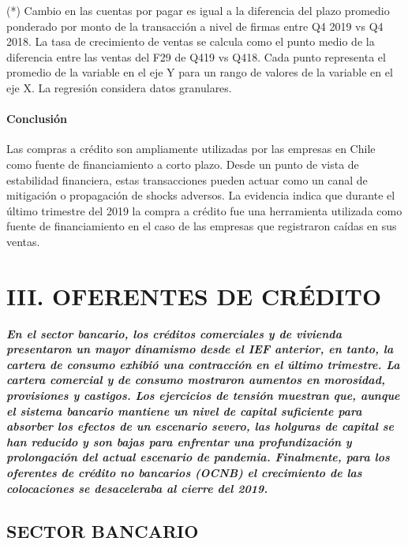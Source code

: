 \documentclass[
]{book}
\begin{document}
(*) Cambio en las cuentas por pagar es igual a la diferencia del plazo promedio ponderado por monto de la transacción a nivel de firmas entre Q4 2019 vs Q4 2018. La tasa de crecimiento de ventas se calcula como el punto medio de la diferencia entre las ventas del F29 de Q419 vs Q418. Cada punto representa el promedio de la variable en el eje Y para un rango de valores de la variable en el eje X. La regresión considera datos granulares.

\hypertarget{REC2.14}{%
\subsubsection*{\texorpdfstring{\textbf{Conclusión}}{Conclusión}}\label{REC2.14}}

Las compras a crédito son ampliamente utilizadas por las
empresas en Chile como fuente de financiamiento a corto
plazo. Desde un punto de vista de estabilidad financiera, estas
transacciones pueden actuar como un canal de mitigación
o propagación de shocks adversos. La evidencia indica que
durante el último trimestre del 2019 la compra a crédito fue una
herramienta utilizada como fuente de financiamiento en el caso
de las empresas que registraron caídas en sus ventas.

\hypertarget{OFC}{%
\chapter*{III. OFERENTES DE CRÉDITO}\label{OFC}}

\textbf{\emph{En el sector bancario, los créditos comerciales y de vivienda presentaron
un mayor dinamismo desde el IEF anterior, en tanto, la cartera de consumo
exhibió una contracción en el último trimestre. La cartera comercial y de
consumo mostraron aumentos en morosidad, provisiones y castigos. Los
ejercicios de tensión muestran que, aunque el sistema bancario mantiene
un nivel de capital suficiente para absorber los efectos de un escenario
severo, las holguras de capital se han reducido y son bajas para enfrentar
una profundización y prolongación del actual escenario de pandemia.
Finalmente, para los oferentes de crédito no bancarios (OCNB) el crecimiento
de las colocaciones se desaceleraba al cierre del 2019.}}

\hypertarget{SB}{%
\section*{SECTOR BANCARIO}\label{SB}}
\end{document}

